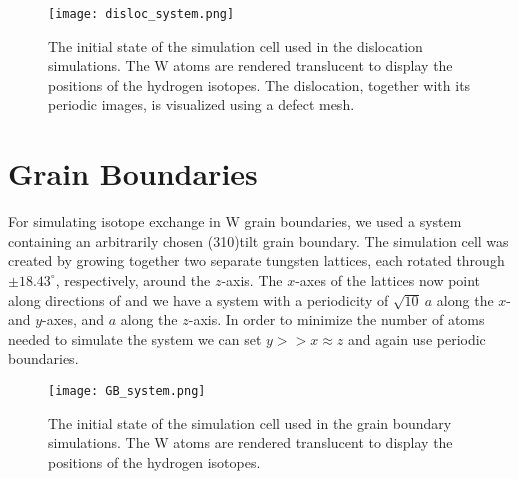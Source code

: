 
\begin{figure}[!ht]
\center
\texttt{[image: disloc\_system.png]}
\caption{The initial state of the simulation cell used in the dislocation simulations. 
The W atoms are rendered translucent to display the positions of the hydrogen isotopes. 
The dislocation, together with its periodic images, is visualized using a defect mesh.}
\label{Fig:disloc_system}
\end{figure}

\section{Grain Boundaries}
For simulating isotope exchange in W grain boundaries, we used a system containing an arbitrarily chosen \hkl(310)\hkl[001] tilt grain boundary. The simulation cell was created by growing together two separate tungsten lattices, each rotated through $\pm18.43^\circ$, respectively, around the $z$-axis. 
The $x$-axes of the lattices now point along directions of  and we have a system with a periodicity of $\sqrt{10}~a$ along the $x$- and $y$-axes, and $a$ along the $z$-axis. 
In order to minimize the number of atoms needed to simulate the system we can set $y >> x \approx z$ and again use periodic boundaries.


\begin{figure}[!ht]
\center
\texttt{[image: GB\_system.png]}
\caption{The initial state of the simulation cell used in the grain boundary simulations. 
The W atoms are rendered translucent to display the positions of the hydrogen isotopes.}
\label{Fig:GB_system}
\end{figure}


